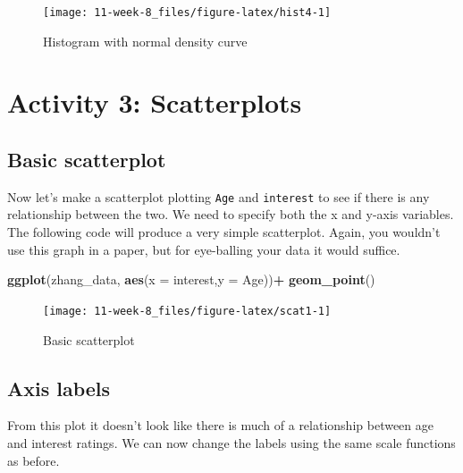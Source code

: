 \documentclass[]{book}
\newenvironment{Shaded}{\begin{snugshade}}{\end{snugshade}}
\newcommand{\DataTypeTok}[1]{\textcolor[rgb]{0.13,0.29,0.53}{#1}}
\newcommand{\KeywordTok}[1]{\textcolor[rgb]{0.13,0.29,0.53}{\textbf{#1}}}
\newcommand{\NormalTok}[1]{#1}
\newcommand{\OperatorTok}[1]{\textcolor[rgb]{0.81,0.36,0.00}{\textbf{#1}}}
\newcommand{\StringTok}[1]{\textcolor[rgb]{0.31,0.60,0.02}{#1}}
\begin{document}
\begin{figure}

{\centering \texttt{[image: 11-week-8\_files/figure-latex/hist4-1]} 

}

\caption{Histogram with normal density curve}\label{fig:hist4}
\end{figure}

\hypertarget{activity-3-scatterplots}{%
\section{Activity 3: Scatterplots}\label{activity-3-scatterplots}}

\hypertarget{basic-scatterplot}{%
\subsection{Basic scatterplot}\label{basic-scatterplot}}

Now let's make a scatterplot plotting \texttt{Age} and \texttt{interest} to see if there is any relationship between the two. We need to specify both the x and y-axis variables. The following code will produce a very simple scatterplot. Again, you wouldn't use this graph in a paper, but for eye-balling your data it would suffice.

\begin{Shaded}
\begin{Highlighting}[]
\KeywordTok{ggplot}\NormalTok{(zhang_data, }\KeywordTok{aes}\NormalTok{(}\DataTypeTok{x =}\NormalTok{ interest,}\DataTypeTok{y =}\NormalTok{ Age))}\OperatorTok{+}
\StringTok{       }\KeywordTok{geom_point}\NormalTok{()}
\end{Highlighting}
\end{Shaded}

\begin{figure}

{\centering \texttt{[image: 11-week-8\_files/figure-latex/scat1-1]} 

}

\caption{Basic scatterplot}\label{fig:scat1}
\end{figure}

\hypertarget{axis-labels-1}{%
\subsection{Axis labels}\label{axis-labels-1}}

From this plot it doesn't look like there is much of a relationship between age and interest ratings. We can now change the labels using the same scale functions as before.
\end{document}

